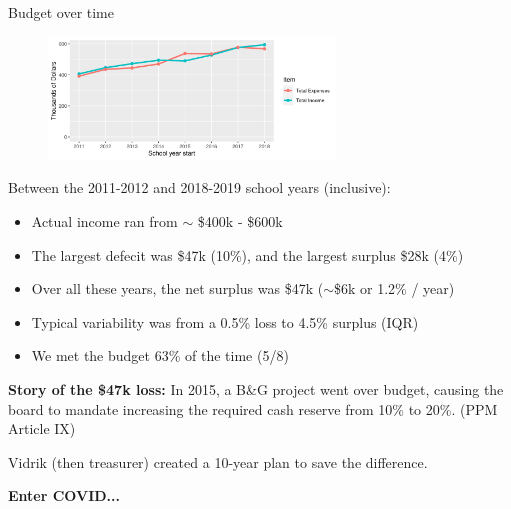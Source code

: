 \documentclass[8pt]{beamer}
\begin{document}
\begin{frame}{Budget over time}
\begin{figure}
\begin{center}
\includegraphics[width=3in]{budget_history.png}
\end{center}
\end{figure}

Between the 2011-2012 and 2018-2019 school years (inclusive):
%
\begin{itemize}
%
\item Actual income ran from $\sim$ \$400k - \$600k
\item The largest defecit was \$47k (10\%), and the largest surplus \$28k (4\%)
\item Over all these years, the net surplus was \$47k ($\sim$\$6k or 1.2\% / year)
\item Typical variability was from a 0.5\% loss to 4.5\% surplus (IQR)
\item We met the budget 63\% of the time (5/8)
%
\end{itemize}
%
\textbf{Story of the \$47k loss:}
In 2015, a B\&G project went over budget, causing the board to mandate
increasing the required cash reserve from 10\% to 20\%.
(PPM Article IX)

Vidrik (then treasurer) created a 10-year plan to save the difference.

\textbf{Enter COVID...}

\end{frame}


\end{document}

